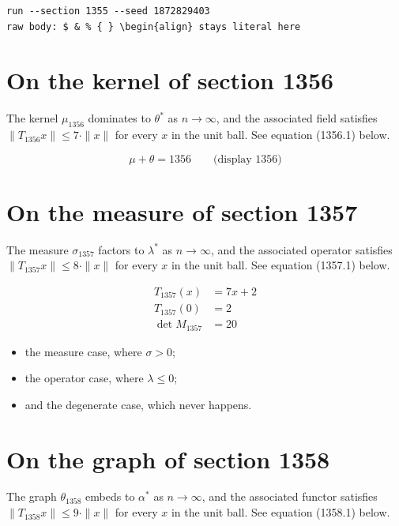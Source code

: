 \documentclass{article}
\begin{document}
\begin{verbatim}
run --section 1355 --seed 1872829403
raw body: $ & % { } \begin{align} stays literal here
\end{verbatim}

\section{On the kernel of section 1356}
The kernel $\mu_{1356}$ dominates to $\theta^{*}$ as $n \to \infty$,
and the associated field satisfies $\|T_{1356} x\| \leq 7 \cdot \|x\|$
for every $x$ in the unit ball. See equation (1356.1) below.

$$
\mu + \theta = 1356 \qquad \text{(display 1356)}
$$

\section{On the measure of section 1357}
The measure $\sigma_{1357}$ factors to $\lambda^{*}$ as $n \to \infty$,
and the associated operator satisfies $\|T_{1357} x\| \leq 8 \cdot \|x\|$
for every $x$ in the unit ball. See equation (1357.1) below.

\begin{align}
T_{1357}(x) &= 7 x + 2 \\
T_{1357}(0) &= 2 \\
\det M_{1357} &= 20
\end{align}

\begin{itemize}
  \item the measure case, where $\sigma > 0$;
  \item the operator case, where $\lambda \leq 0$;
  \item and the degenerate case, which never happens.
\end{itemize}

\section{On the graph of section 1358}
The graph $\theta_{1358}$ embeds to $\alpha^{*}$ as $n \to \infty$,
and the associated functor satisfies $\|T_{1358} x\| \leq 9 \cdot \|x\|$
for every $x$ in the unit ball. See equation (1358.1) below.
\end{document}
